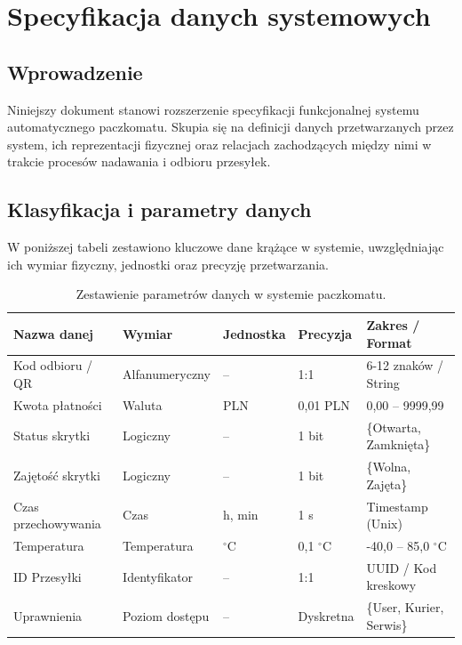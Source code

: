 \documentclass[a4paper,12pt]{article}
\begin{document}
\section{Specyfikacja danych systemowych}

\subsection{Wprowadzenie}
Niniejszy dokument stanowi rozszerzenie specyfikacji funkcjonalnej systemu automatycznego paczkomatu. Skupia się na definicji danych przetwarzanych przez system, ich reprezentacji fizycznej oraz relacjach zachodzących między nimi w trakcie procesów nadawania i odbioru przesyłek.

\subsection{Klasyfikacja i parametry danych}
W poniższej tabeli zestawiono kluczowe dane krążące w systemie, uwzględniając ich wymiar fizyczny, jednostki oraz precyzję przetwarzania.

\begin{table}[h!]
\small
\centering
\begin{tabularx}{\textwidth}{l l l l X}
\toprule
\textbf{Nazwa danej} & \textbf{Wymiar} & \textbf{Jednostka} & \textbf{Precyzja} & \textbf{Zakres / Format} \\ \midrule
Kod odbioru / QR  & Alfanumeryczny & -- & 1:1 & 6-12 znaków / String \\
Kwota płatności  & Waluta & PLN & 0,01 PLN & 0,00 -- 9999,99 \\
Status skrytki  & Logiczny & -- & 1 bit & \{Otwarta, Zamknięta\} \\
Zajętość skrytki  & Logiczny & -- & 1 bit & \{Wolna, Zajęta\} \\
Czas przechowywania  & Czas & h, min & 1 s & Timestamp (Unix) \\
Temperatura  & Temperatura & $^\circ$C & 0,1 $^\circ$C & -40,0 -- 85,0 $^\circ$C \\
ID Przesyłki  & Identyfikator & -- & 1:1 & UUID / Kod kreskowy \\
Uprawnienia  & Poziom dostępu & -- & Dyskretna & \{User, Kurier, Serwis\} \\
\bottomrule
\end{tabularx}
\caption{Zestawienie parametrów danych w systemie paczkomatu.}
\end{table}
\end{document}
